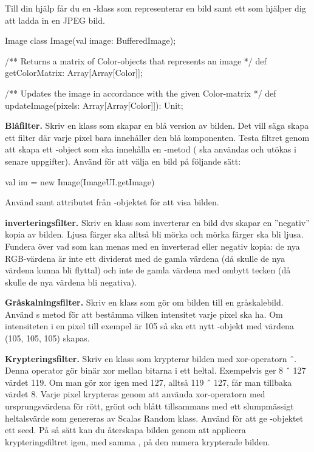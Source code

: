 Till din hjälp får du en -klass som representerar en bild samt ett  som hjälper dig att ladda in en JPEG bild.

\begin{ScalaSpec}{Image}
class Image(val image: BufferedImage);

/** Returns a matrix of Color-objects that represents an image */
def getColorMatrix: Array[Array[Color]];

/** Updates the image in accordance with the given Color-matrix */
def updateImage(pixels: Array[Array[Color]]): Unit;
\end{ScalaSpec}


\Task \textbf{Blåfilter.} Skriv en klass  som skapar en blå version av bilden. Det vill säga skapa ett filter där varje pixel bara innehåller den blå komponenten. Testa filtret genom att skapa ett -object som ska innehålla en -metod ( ska användas och utökas i senare uppgifter). Använd  för att välja en bild på följande sätt:
\begin{Code}
val im = new Image(ImageUI.getImage)
\end{Code}
Använd  samt  attributet från -objektet för att visa bilden. 

\Task \textbf{inverteringsfilter.} Skriv en klass  som inverterar en bild dvs skapar en ''negativ'' kopia av bilden. Ljusa färger ska alltså bli mörka och mörka färger ska bli ljusa.
Fundera över vad som kan menas med en inverterad eller negativ kopia: de nya RGB-värdena är inte ett dividerat med de gamla värdena (då skulle de nya värdena kunna bli flyttal) och inte de gamla värdena med ombytt tecken (då skulle de nya värdena bli negativa).

\Task \textbf{Gråskalningsfilter.} Skriv en klass  som gör om bilden till en gråskalebild. Använd s  metod för att bestämma vilken intensitet varje pixel ska ha. Om intensiteten i en pixel till exempel är 105 så ska ett nytt -objekt med värdena (105, 105, 105) skapas.

\Task \textbf{Krypteringsfilter.} Skriv en klass  som krypterar bilden med xor-operatorn ˆ. Denna operator gör binär xor mellan bitarna i ett heltal. Exempelvis ger 8 ˆ 127 värdet 119. Om man gör xor igen med 127, alltså 119 ˆ 127, får man tillbaka värdet 8. Varje pixel krypteras genom att använda xor-operatorn med ursprungsvärdena för rött, grönt och blått tillsammans med ett slumpmässigt heltalsvärde som genereras av Scalas Random klass. Använd  för att ge -objektet ett seed. På så sätt kan du återskapa bilden genom att applicera krypteringsfiltret igen, med samma , på den numera krypterade bilden.

